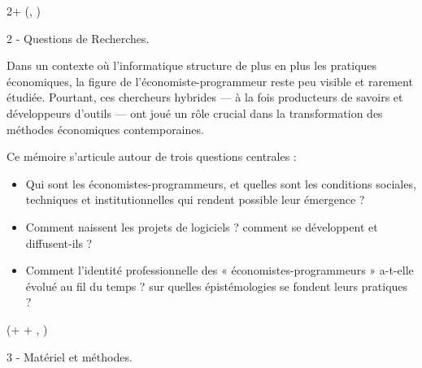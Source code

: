 \documentclass{beamer}
\newlength{\blockOne}
\newlength{\blockTwo}
\newlength{\blockTwoandHalf}
\begin{document}
\begin{frame}[t]
\begin{textblock*}{\colwidth}
\end{textblock*}





\begin{textblock*}{2\colwidth + \colsep}(\leftmargin, \blockTwoandHalf)

	\begin{alertblock}{2 - Questions de Recherches.}
	\RaggedRight
	\vspace{0.25cm}

	Dans un contexte où l’informatique structure de plus en plus les pratiques économiques, la figure de l’économiste-programmeur reste peu visible et rarement étudiée. Pourtant, ces chercheurs hybrides — à la fois producteurs de savoirs et développeurs d’outils — ont joué un rôle crucial dans la transformation des méthodes économiques contemporaines.

	Ce mémoire s’articule autour de trois questions centrales :
		  \begin{itemize}
			\item Qui sont les économistes-programmeurs, et quelles sont les conditions sociales, techniques et institutionnelles qui rendent possible leur émergence ?
			\item Comment naissent les projets de logiciels ? comment se développent et diffusent-ils ?
			\item Comment l'identité professionnelle des « économistes-programmeurs » a-t-elle évolué au fil du temps ? sur quelles épistémologies se fondent leurs pratiques ?
		  \end{itemize}

	\vspace{0.25cm}
	\end{alertblock}

\end{textblock*}





\begin{textblock*}{\colwidth}(\leftmargin + \colwidth + \colsep, \blockOne)

	\begin{alertblock}{3 - Matériel et méthodes.}
	\RaggedRight
	\vspace{0.25cm}


\end{alertblock}
\end{textblock*}
\end{frame}
\end{document}
